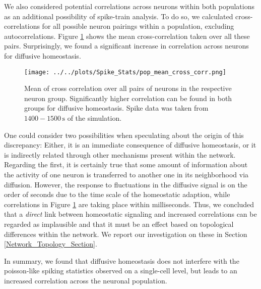 \documentclass[10pt,a4paper]{article}
\begin{document}
We also considered potential correlations across neurons within both populations as an additional possibility of spike-train analysis. To do so, we calculated cross-correlations for all possible neuron pairings within a population, excluding autocorrelations. Figure \ref{Pop_Mean_Cross_Corr} shows the mean cross-correlation taken over all these pairs. Surprisingly, we found a significant increase in correlation across neurons for diffusive homeostasis. 
\begin{figure}
\texttt{[image: ../../plots/Spike\_Stats/pop\_mean\_cross\_corr.png]}
\caption[Mean of cross correlation over all pairs of neurons in the respective neuron group]{Mean of cross correlation over all pairs of neurons in the respective neuron group. Significantly higher correlation can be found in both groups for diffusive homeostasis. Spike data was taken from $\mathrm{1400-1500\,s}$ of the simulation.}
\label{Pop_Mean_Cross_Corr}
\end{figure}
One could consider two possibilities when speculating about the origin of this discrepancy: Either, it is an immediate consequence of diffusive homeostasis, or it is indirectly related through other mechanisms present within the network. Regarding the first, it is certainly true that some amount of information about the activity of one neuron is transferred to another one in its neighborhood via diffusion. However, the response to fluctuations in the diffusive signal is on the order of seconds due to the time scale of the homeostatic adaption, while correlations in Figure \ref{Pop_Mean_Cross_Corr} are taking place within milliseconds. Thus, we concluded that a \emph{direct} link between homeostatic signaling and increased correlations can be regarded as implausible and that it must be an effect based on topological differences within the network. We report our investigation on these in Section \ref{Network_Topology_Section}.

In summary, we found that diffusive homeostasis does not interfere with the poisson-like spiking statistics observed on a single-cell level, but leads to an increased correlation across the neuronal population. 
\end{document}
